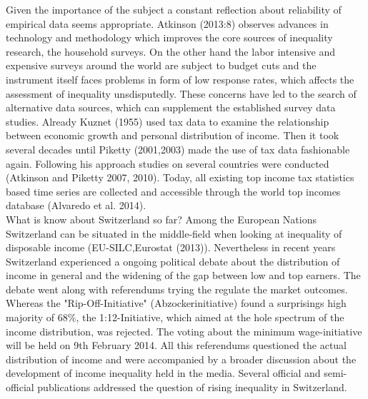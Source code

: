 \documentclass[twoside]{article}\usepackage[]{graphicx}\usepackage[]{color}
\begin{document}
\begin{multicols}{2}
Given the importance of the subject a constant reflection about reliability of empirical data seems appropriate. Atkinson (2013:8) observes advances in technology and methodology which improves the core sources of inequality research, the household surveys.  On the other hand the labor intensive and expensive surveys around the world are subject to budget cuts and the instrument itself faces problems in form of low response rates, which affects the assessment of inequality unsdisputedly. These concerns have led to the search of alternative data sources, which can supplement the established survey data studies. Already Kuznet (1955) used tax data to examine the relationship between economic growth and personal distribution of income. Then it took several decades until Piketty (2001,2003) made the use of tax data fashionable again. Following his approach studies on several countries were conducted (Atkinson and Piketty 2007, 2010). Today, all existing top income tax statistics based time series are collected and accessible through the world top incomes database (Alvaredo et al. 2014). \\

% 

What is know about Switzerland so far? Among the European Nations Switzerland can be situated in the middle-field when looking at inequality of disposable income (EU-SILC,Eurostat (2013)). Nevertheless in recent years Switzerland experienced  a ongoing political debate about the distribution of income in general and the widening of the gap between low and top earners. The debate went along with referendums trying the regulate the market outcomes. Whereas the "Rip-Off-Initiative" (Abzockerinitiative) found a surprisings high majority of 68\%, the 1:12-Initiative, which aimed at the hole spectrum of the income distribution, was rejected. The voting about the minimum wage-initiative will be held on 9th February 2014. All this referendums questioned the actual distribution of income and were accompanied by a broader discussion about the development of income inequality held in the media. Several official and semi-official publications addressed the question of rising inequality in Switzerland. \\




\end{multicols}
\end{document}
